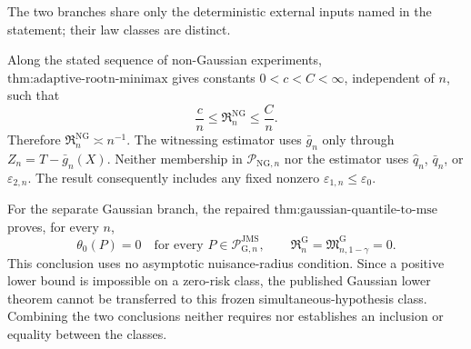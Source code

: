 The two branches share only the deterministic external inputs named in the statement; their law classes are distinct.

Along the stated sequence of non-Gaussian experiments, \(\text{thm:adaptive-rootn-minimax}\) gives constants \(0<c<C<\infty\), independent of \(n\), such that
\[
 \frac{c}{n}
 \le \mathfrak R_n^{\mathrm{NG}}
 \le \frac{C}{n}.
\]
Therefore \(\mathfrak R_n^{\mathrm{NG}}\asymp n^{-1}\).  The witnessing estimator uses \(\bar g_n\) only through \(Z_n=T-\bar g_n(X)\).  Neither membership in \(\mathcal P_{\mathrm{NG},n}\) nor the estimator uses \(\widehat q_n\), \(\bar q_n\), or \(\varepsilon_{2,n}\).  The result consequently includes any fixed nonzero \(\varepsilon_{1,n}\le\varepsilon_0\).

For the separate Gaussian branch, the repaired \(\text{thm:gaussian-quantile-to-mse}\) proves, for every \(n\),
\[
 \theta_0(P)=0\quad\text{for every }P\in\mathcal P_{\mathrm G,n}^{\mathrm{JMS}},
 \qquad
 \mathfrak R_n^{\mathrm G}
 =\mathfrak M_{n,1-\gamma}^{\mathrm G}=0.
\]
This conclusion uses no asymptotic nuisance-radius condition.  Since a positive lower bound is impossible on a zero-risk class, the published Gaussian lower theorem cannot be transferred to this frozen simultaneous-hypothesis class.  Combining the two conclusions neither requires nor establishes an inclusion or equality between the classes.